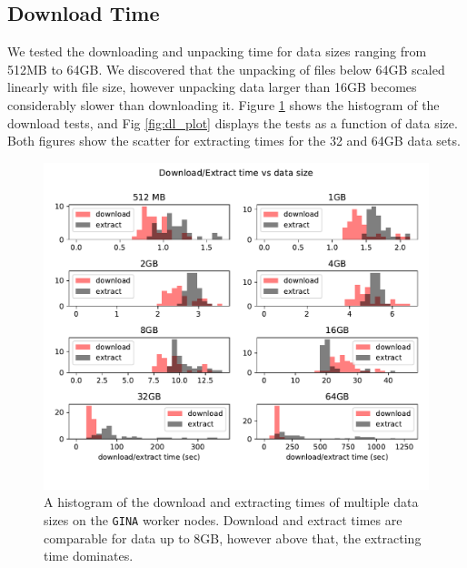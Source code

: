 \documentclass[preprint,5p]{elsarticle}
\begin{document}
\subsection{Download Time}

We tested the downloading and unpacking time for data sizes ranging from 512MB to 64GB. We discovered that the unpacking of files below 64GB scaled linearly with file size, however unpacking data larger than 16GB becomes considerably slower than downloading it. Figure \ref{fig:dl_hist} shows the histogram of the download tests, and Fig \ref{fig:dl_plot} displays the tests as a function of data size. Both figures show the scatter for extracting times for the 32 and 64GB data sets. 


\begin{figure}
    \includegraphics[width=0.95\linewidth]{figures/dl_ex.pdf}
      \caption{A histogram of the download and extracting times of multiple data sizes on the \texttt{GINA} worker nodes. Download and extract times are comparable for data up to 8GB, however above that, the extracting time dominates.  }
	\label{fig:dl_hist}
\end{figure}
\end{document}
